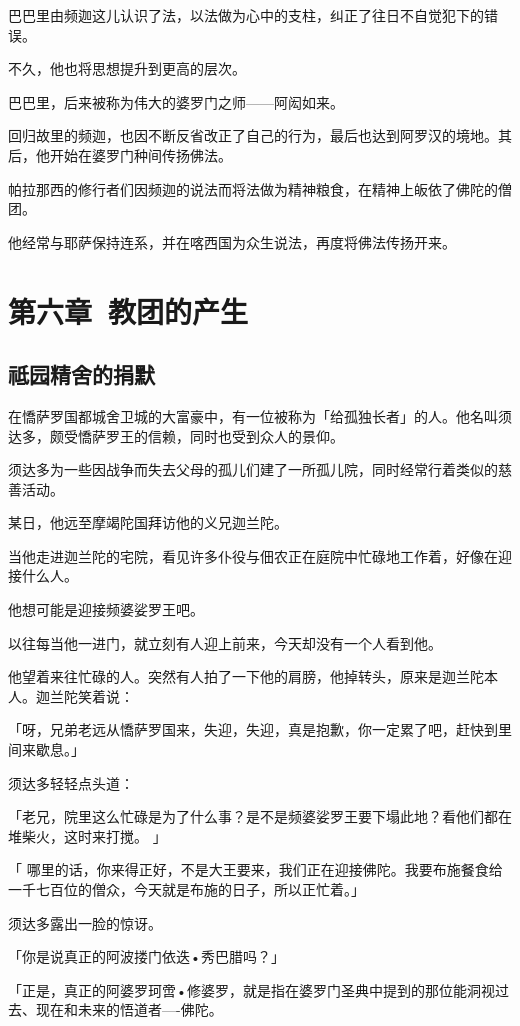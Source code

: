 \documentclass[twoside,openany]{book}
\begin{document}
巴巴里由频迦这儿认识了法，以法做为心中的支柱，纠正了往日不自觉犯下的错误。

不久，他也将思想提升到更高的层次。

巴巴里，后来被称为伟大的婆罗门之师——阿闳如来。

回归故里的频迦，也因不断反省改正了自己的行为，最后也达到阿罗汉的境地。其后，他开始在婆罗门种间传扬佛法。

帕拉那西的修行者们因频迦的说法而将法做为精神粮食，在精神上皈依了佛陀的僧团。

他经常与耶萨保持连系，并在喀西国为众生说法，再度将佛法传扬开来。

\chapter{第六章\ 教团的产生}\label{ch6}

\section{祗园精舍的捐默}\label{sec6.1}

在憍萨罗国都城舍卫城的大富豪中，有一位被称为「给孤独长者」的人。他名叫须达多，颇受憍萨罗王的信赖，同时也受到众人的景仰。

须达多为一些因战争而失去父母的孤儿们建了一所孤儿院，同时经常行着类似的慈善活动。

某日，他远至摩竭陀国拜访他的义兄迦兰陀。

当他走进迦兰陀的宅院，看见许多仆役与佃农正在庭院中忙碌地工作着，好像在迎接什么人。

他想可能是迎接频婆娑罗王吧。

以往每当他一进门，就立刻有人迎上前来，今天却没有一个人看到他。

他望着来往忙碌的人。突然有人拍了一下他的肩膀，他掉转头，原来是迦兰陀本人。迦兰陀笑着说：

「呀，兄弟老远从憍萨罗国来，失迎，失迎，真是抱歉，你一定累了吧，赶快到里间来歇息。」

须达多轻轻点头道：

「老兄，院里这么忙碌是为了什么事？是不是频婆娑罗王要下塌此地？看他们都在堆柴火，这时来打搅。	」

「 哪里的话，你来得正好，不是大王要来，我们正在迎接佛陀。我要布施餐食给一千七百位的僧众，今天就是布施的日子，所以正忙着。」

须达多露出一脸的惊讶。

「你是说真正的阿波搂门依迭•秀巴腊吗？」

「正是，真正的阿婆罗珂啻•修婆罗，就是指在婆罗门圣典中提到的那位能洞视过去、现在和未来的悟道者----佛陀。
\end{document}
